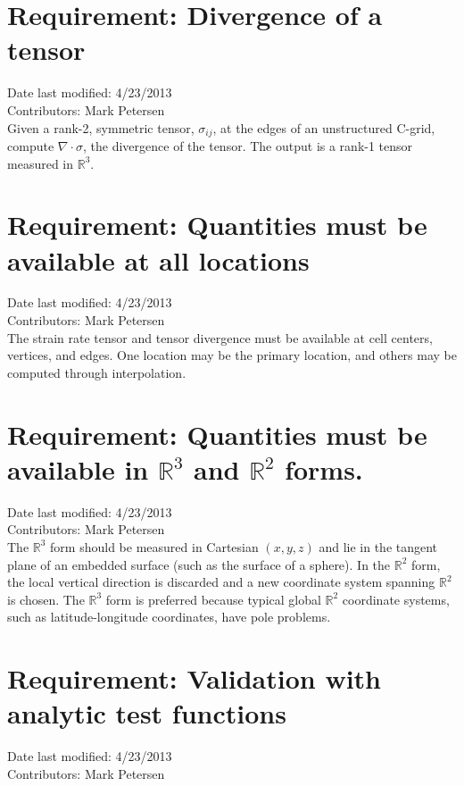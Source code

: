 \documentclass[11pt]{report}
\begin{document}
\section{Requirement: Divergence of a tensor}
Date last modified: 4/23/2013 \\
Contributors: Mark Petersen \\

Given a rank-2, symmetric tensor, $\sigma_{ij}$, at the edges of an unstructured C-grid, compute $\nabla\cdot\sigma$, the divergence of the tensor.  The output is a rank-1 tensor measured in $\mathbb{R}^3$.

\section{Requirement: Quantities must be available at all locations}
Date last modified: 4/23/2013 \\
Contributors: Mark Petersen \\

The strain rate tensor and tensor divergence must be available at cell centers, vertices, and edges.  One location may be the primary location, and others may be computed through interpolation.

\section{Requirement: Quantities must be available in $\mathbb{R}^3$ and $\mathbb{R}^2$ forms.}
Date last modified: 4/23/2013 \\
Contributors: Mark Petersen \\

The $\mathbb{R}^3$ form should be measured in Cartesian $(x,y,z)$ and lie in the tangent plane of an embedded surface (such as the surface of a sphere). In the $\mathbb{R}^2$ form, the local vertical direction is discarded and a new coordinate system spanning $\mathbb{R}^2$ is chosen.  The $\mathbb{R}^3$ form is preferred because typical global $\mathbb{R}^2$ coordinate systems, such as latitude-longitude coordinates, have pole problems.

\section{Requirement: Validation with analytic test functions}
Date last modified: 4/23/2013 \\
Contributors: Mark Petersen \\
\end{document}
